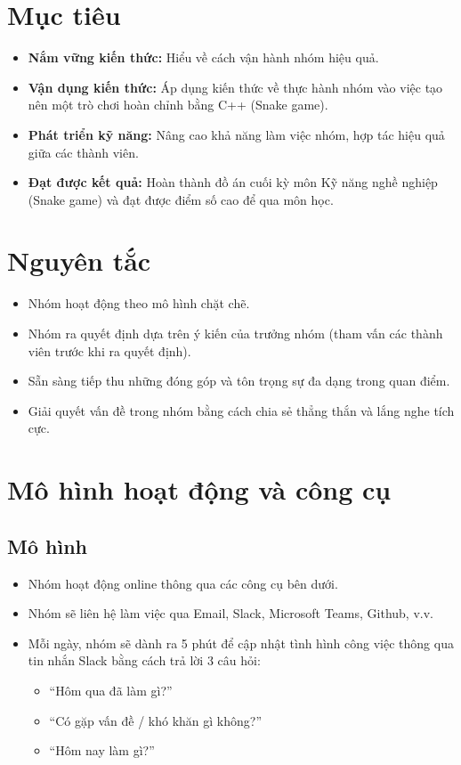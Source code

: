 \documentclass{article}
\begin{document}
\section{Mục tiêu}
\begin{itemize}
    \item \textbf{Nắm vững kiến thức:} Hiểu về cách vận hành nhóm hiệu quả.
    \item \textbf{Vận dụng kiến thức:} Áp dụng kiến thức về thực hành nhóm vào việc tạo nên một trò chơi hoàn chỉnh bằng C++ (Snake game).
    \item \textbf{Phát triển kỹ năng:} Nâng cao khả năng làm việc nhóm, hợp tác hiệu quả giữa các thành viên.
    \item \textbf{Đạt được kết quả:} Hoàn thành đồ án cuối kỳ môn Kỹ năng nghề nghiệp (Snake game) và đạt được điểm số cao để qua môn học.
\end{itemize}

\section{Nguyên tắc}
\begin{itemize}
    \item Nhóm hoạt động theo mô hình chặt chẽ.
    \item Nhóm ra quyết định dựa trên ý kiến của trưởng nhóm (tham vấn các thành viên trước khi ra quyết định).
    \item Sẵn sàng tiếp thu những đóng góp và tôn trọng sự đa dạng trong quan điểm.
    \item Giải quyết vấn đề trong nhóm bằng cách chia sẻ thẳng thắn và lắng nghe tích cực.
\end{itemize}

\section{Mô hình hoạt động và công cụ}

\subsection{Mô hình}
\begin{itemize}
    \item Nhóm hoạt động online thông qua các công cụ bên dưới.
    \item Nhóm sẽ liên hệ làm việc qua Email, Slack, Microsoft Teams, Github, v.v.
    \item Mỗi ngày, nhóm sẽ dành ra 5 phút để cập nhật tình hình công việc thông qua tin nhắn Slack bằng cách trả lời 3 câu hỏi: 
    \begin{itemize}
        \item “Hôm qua đã làm gì?”
        \item “Có gặp vấn đề / khó khăn gì không?”
        \item “Hôm nay làm gì?”
    \end{itemize}
\end{itemize}
\end{document}

